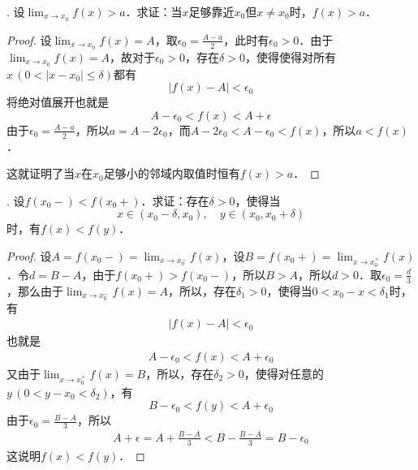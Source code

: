 . 设$\displaystyle\lim_{x \to x_0} f(x) > a$．求证：当$x$足够靠近$x_0$但$x \neq x_0$时，$f(x) > a$．

\begin{proof}
设$\displaystyle\lim_{x \to x_0} f(x) = A$，取$\epsilon_0 = \displaystyle\frac{A-a}{2}$，此时有$\epsilon_0 > 0$．由于$\displaystyle\lim_{x \to x_0} f(x) = A$，故对于$\epsilon_0 > 0$，存在$\delta > 0$，使得使得对所有$x \, (0 < |x-x_0| \leq \delta)$都有
\begin{equation}
    |f(x)-A|<\epsilon_0
\end{equation}
将绝对值展开也就是
\begin{equation}
    A-\epsilon_0 < f(x) < A+\epsilon
\end{equation}
由于$\epsilon_0=\displaystyle\frac{A-a}{2}$，所以$a = A - 2\epsilon_0$，而$A-2\epsilon_0 < A - \epsilon_0 < f(x)$，所以$a < f(x)$．

\noindent 这就证明了当$x$在$x_0$足够小的邻域内取值时恒有$f(x) > a$．
\end{proof}

. 设$f(x_0 -) < f(x_0 +)$．求证：存在$\delta > 0$，使得当
\begin{equation}
    x \in (x_0 - \delta, x_0), \quad y \in (x_0, x_0 + \delta)
\end{equation}
时，有$f(x) < f(y)$．

\begin{proof}
设$A = f(x_0 -) = \displaystyle\lim_{x \to x_0^-} f(x)$，设$B = f(x_0 +) = \displaystyle\lim_{x \to x_0^+} f(x)$．令$d = B - A$，由于$f(x_0 +) > f(x_0 -)$，所以$B > A$，所以$d > 0$．取$\epsilon_0 = \displaystyle\frac{d}{3}$，那么由于$\displaystyle\lim_{x \to x_0^-} f(x) = A$，所以，存在$\delta_1 > 0$，使得当$0 < x_0 - x < \delta_1$时，有
\begin{align}
    |f(x) - A|<\epsilon_0
\end{align}
也就是
\begin{align}
    A - \epsilon_0 < f(x) < A + \epsilon_0
\end{align}
又由于$\displaystyle\lim_{x \to x_0^+} f(x) = B$，所以，存在$\delta_2 > 0$，使得对任意的$y \, (0 < y - x_0 < \delta_2)$，有
\begin{equation}
    B - \epsilon_0 < f(y) < A + \epsilon_0
\end{equation}
由于$\epsilon_0 = \displaystyle\frac{B-A}{3}$，所以
\begin{align}
    A + \epsilon = A + \frac{B-A}{3} < B - \frac{B-A}{3} = B-\epsilon_0
\end{align}
这说明$f(x) < f(y)$．
\end{proof}

